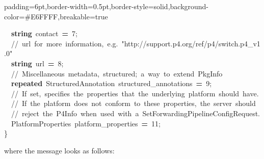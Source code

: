 \documentclass[11pt]{article}
\begin{document}
{\begin{mdbmargintb}{6pt}{6pt}
\begin{mdblock}{padding=6pt,border-width=0.5pt,border-style=solid,background-color=\#E6FFFF,breakable=true}
\begin{mdpre}
{{~~{\bfseries{string}}~contact~{\bfseries{=}}~{7};\\
~~{//~url~for~more~information,~e.g.~"http://support.p4.org/ref/p4/switch.p4\_v1.0"}\\
~~{\bfseries{string}}~url~{\bfseries{=}}~{8};\\
~~{//~Miscellaneous~metadata,~structured;~a~way~to~extend~PkgInfo}\\
~~{\bfseries{repeated}}~StructuredAnnotation~structured\_annotations~{\bfseries{=}}~{9};\\
~~{//~If~set,~specifies~the~properties~that~the~underlying~platform~should~have.}\\
~~{//~If~the~platform~does~not~conform~to~these~properties,~the~server~should}\\
~~{//~reject~the~P4Info~when~used~with~a~SetForwardingPipelineConfigRequest.}\\
~~PlatformProperties~platform\_properties~{\bfseries{=}}~{11};\\
\}}}%
\end{mdpre}%
\end{mdblock}%
\end{mdbmargintb}%

\noindent{}where the  message looks as follows:%

}
\end{document}
